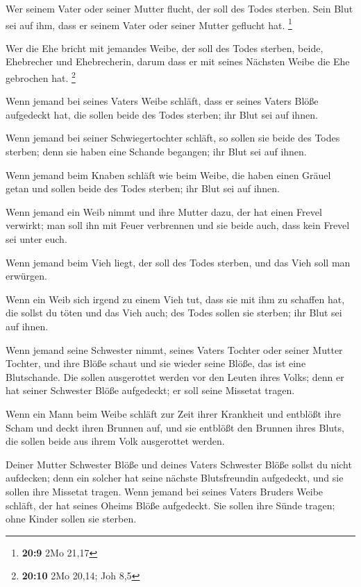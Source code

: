  Wer seinem Vater oder seiner Mutter flucht, der soll des
Todes sterben. Sein Blut sei auf ihm, dass er seinem Vater oder seiner
Mutter geflucht hat. \footnote{\textbf{20:9} 2Mo 21,17}

 Wer die Ehe bricht mit jemandes Weibe, der soll des Todes
sterben, beide, Ehebrecher und Ehebrecherin, darum dass er mit seines
Nächsten Weibe die Ehe gebrochen hat. \footnote{\textbf{20:10} 2Mo
  20,14; Joh 8,5}

 Wenn jemand bei seines Vaters Weibe schläft, dass er
seines Vaters Blöße aufgedeckt hat, die sollen beide des Todes sterben;
ihr Blut sei auf ihnen.

 Wenn jemand bei seiner Schwiegertochter schläft, so sollen
sie beide des Todes sterben; denn sie haben eine Schande begangen; ihr
Blut sei auf ihnen.

 Wenn jemand beim Knaben schläft wie beim Weibe, die haben
einen Gräuel getan und sollen beide des Todes sterben; ihr Blut sei auf
ihnen.

 Wenn jemand ein Weib nimmt und ihre Mutter dazu, der hat
einen Frevel verwirkt; man soll ihn mit Feuer verbrennen und sie beide
auch, dass kein Frevel sei unter euch.

 Wenn jemand beim Vieh liegt, der soll des Todes sterben,
und das Vieh soll man erwürgen.

 Wenn ein Weib sich irgend zu einem Vieh tut, dass sie mit
ihm zu schaffen hat, die sollst du töten und das Vieh auch; des Todes
sollen sie sterben; ihr Blut sei auf ihnen.

 Wenn jemand seine Schwester nimmt, seines Vaters Tochter
oder seiner Mutter Tochter, und ihre Blöße schaut und sie wieder seine
Blöße, das ist eine Blutschande. Die sollen ausgerottet werden vor den
Leuten ihres Volks; denn er hat seiner Schwester Blöße aufgedeckt; er
soll seine Missetat tragen.

 Wenn ein Mann beim Weibe schläft zur Zeit ihrer Krankheit
und entblößt ihre Scham und deckt ihren Brunnen auf, und sie entblößt
den Brunnen ihres Bluts, die sollen beide aus ihrem Volk ausgerottet
werden.

 Deiner Mutter Schwester Blöße und deines Vaters Schwester
Blöße sollst du nicht aufdecken; denn ein solcher hat seine nächste
Blutsfreundin aufgedeckt, und sie sollen ihre Missetat tragen.
 Wenn jemand bei seines Vaters Bruders Weibe schläft, der
hat seines Oheims Blöße aufgedeckt. Sie sollen ihre Sünde tragen; ohne
Kinder sollen sie sterben.

